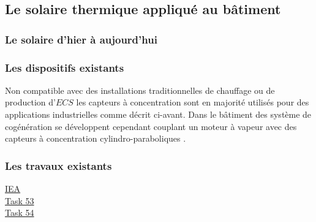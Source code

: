 \subsection{Le solaire thermique appliqué au bâtiment} %
\label{sub:le_solaire_thermique_applique_au_batiment}

\subsubsection{Le solaire d’hier à aujourd’hui} %
\label{ssub:le_solaire_d_hier_a_aujourd_hui}




\subsubsection{Les dispositifs existants} %
\label{ssub:les_dispositifs_existants}
Non compatible avec des installations traditionnelles de chauffage ou de production
d’$ECS$ les capteurs à concentration sont en majorité utilisés pour des applications
industrielles comme décrit ci-avant. Dans le bâtiment des système de cogénération
se développent cependant couplant un moteur à vapeur avec des capteurs à concentration
cylindro-paraboliques .


\subsubsection{Les travaux existants} %
\label{ssub:les_travaux_existants}

\href{http://www.iea-shc.org/tasks-current}{IEA}\\
\href{http://task53.iea-shc.org/publications}{Task 53}\\
\href{http://task54.iea-shc.org/publications}{Task 54}\\

